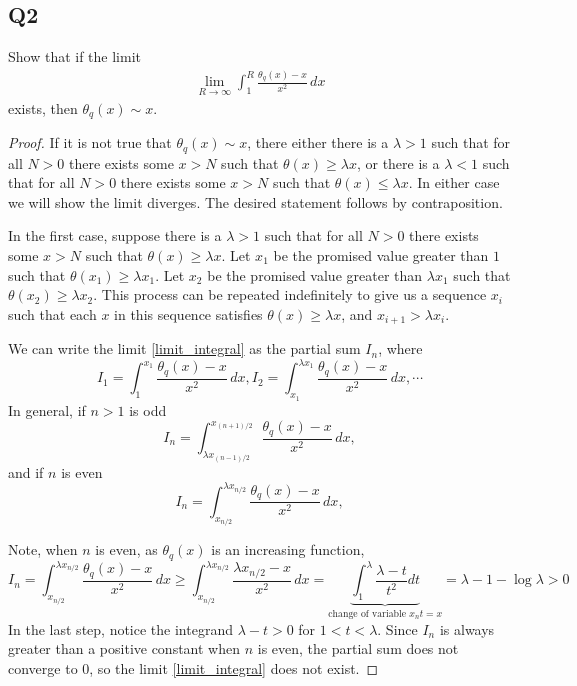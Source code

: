 \documentclass{article}
\theoremstyle{definition}
\theoremstyle{definition}
\theoremstyle{remark}
\begin{document}
\subsection*{Q2}

Show that if the limit
\begin{align}\label{limit_integral}
\lim_{R \to \infty} \int_1^R \frac{\theta_q(x) - x}{x^2} \,dx
\end{align}
exists, then $\theta_q(x) \sim x$.

\begin{proof}
	If it is not true that $\theta_q(x) \sim x$, there either there is a $\lambda > 1$ such that for all $N > 0$ there exists some $x > N$ such that $\theta(x) \geq \lambda x$, or there is a $\lambda < 1$ such that for all $N > 0$ there exists some $x > N$ such that $\theta(x) \leq \lambda x$.
	In either case we will show the limit diverges. 
	The desired statement follows by contraposition.

	In the first case, suppose there is a $\lambda > 1$ such that for all $N > 0$ there exists some $x > N$ such that $\theta(x) \geq \lambda x$.
	Let $x_1$ be the promised value greater than $1$ such that
	$\theta(x_1) \geq \lambda x_1$. 
	Let $x_2$ be the promised value greater than $\lambda x_1$ such that $\theta(x_2) \geq \lambda x_2$. 
	This process can be repeated indefinitely to give us a sequence $x_i$ such that each $x$ in this sequence satisfies $\theta(x) \geq \lambda x$, and $x_{i+1} > \lambda x_i$.

	We can write the limit \eqref{limit_integral} as the partial sum $I_n$, where
	$$
	I_1 = \int_1^{x_1} \frac{\theta_q(x) - x}{x^2} \,dx,
	I_2 = \int_{x_1}^{\lambda x_1} \frac{\theta_q(x) - x}{x^2} \,dx, \cdots
	$$
	In general, if $n > 1$ is odd
	$$
	I_n = \int_{\lambda x_{(n-1)/2}}^{x_{(n+1)/2}} \frac{\theta_q(x) - x}{x^2} \,dx,
	$$
	and if $n$ is even
	$$
	I_n = \int_{x_{n/2}}^{\lambda x_{n/2}} \frac{\theta_q(x) - x}{x^2} \,dx,
	$$

	Note, when $n$ is even, as $\theta_q (x)$ is an increasing function,
	$$
	I_n = \int_{x_{n/2}}^{\lambda x_{n/2}} \frac{\theta_q(x) - x}{x^2} \,dx
	\geq 
	\int_{x_{n/2}}^{\lambda x_{n/2}} \frac{\lambda x_{n/2} - x}{x^2} \,dx 
	=
	\underbrace{
		\int_{1}^{\lambda} \frac{\lambda -t}{t^2} dt
	}_{\text{change of variable } x_n t = x}
	= \lambda -1 - \log \lambda > 0
	$$
	In the last step, notice the integrand $\lambda - t > 0 $ for $1<t < \lambda$.
	Since $I_n$ is always greater than a positive constant when $n$ is even, the partial sum does not converge to $0$, so the limit \eqref{limit_integral} does not exist.


\end{proof}
\end{document}
